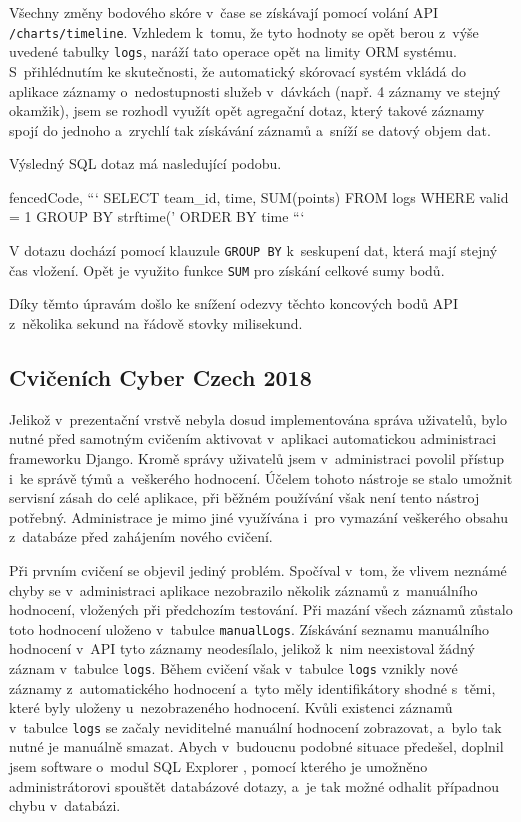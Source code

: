 \documentclass[
  digital,
  twoside,
  table, 
  nolof, 
  nolot
]{fithesis3}
\begin{document}
Všechny změny bodového skóre v~čase se získávají pomocí volání API \texttt{/charts/timeline}. Vzhledem k~tomu, že tyto hodnoty se opět berou z~výše uvedené tabulky \texttt{logs}, naráží tato operace opět na limity ORM systému. S~přihlédnutím ke skutečnosti, že automatický skórovací systém vkládá do aplikace záznamy o~nedostupnosti služeb v~dávkách (např. 4 záznamy ve stejný okamžik), jsem se rozhodl využít opět agregační dotaz, který takové záznamy spojí do jednoho a~zrychlí tak získávání záznamů a~sníží se datový objem dat.

Výsledný SQL dotaz má nasledující podobu.

\begin{markdown*}{%
  fencedCode,
}
```
SELECT team_id, time, SUM(points) FROM logs 
WHERE valid = 1 
GROUP BY strftime('%
ORDER BY time
```
\end{markdown*}

V dotazu dochází pomocí klauzule \texttt{GROUP\ BY} k~seskupení dat, která mají stejný čas vložení. Opět je využito funkce \texttt{SUM} pro získání celkové sumy bodů.

Díky těmto úpravám došlo ke snížení odezvy těchto koncových bodů API z~několika sekund na řádově stovky milisekund. 

\subsection{Cvičeních Cyber Czech 2018}

Jelikož v~prezentační vrstvě nebyla dosud implementována správa uživatelů, bylo nutné před samotným cvičením aktivovat v~aplikaci automatickou administraci frameworku Django. Kromě správy uživatelů jsem v~administraci povolil přístup i~ke správě týmů a~veškerého hodnocení. Účelem tohoto nástroje se stalo umožnit servisní zásah do celé aplikace, při běžném používání však není tento nástroj potřebný. Administrace je mimo jiné využívána i~pro vymazání veškerého obsahu z~databáze před zahájením nového cvičení.

Při prvním cvičení se objevil jediný problém. Spočíval v~tom, že vlivem neznámé chyby se v~administraci aplikace nezobrazilo několik záznamů z~manuálního hodnocení, vložených při předchozím testování. Při mazání všech záznamů zůstalo toto hodnocení uloženo v~tabulce \texttt{manualLogs}. Získávání seznamu manuálního hodnocení v~API tyto záznamy neodesílalo, jelikož k~nim neexistoval žádný záznam v~tabulce \texttt{logs}. Během cvičení však v~tabulce \texttt{logs} vznikly nové záznamy z~automatického hodnocení a~tyto měly identifikátory shodné s~těmi, které byly uloženy u~nezobrazeného hodnocení. Kvůli existenci záznamů v~tabulce \texttt{logs} se začaly neviditelné manuální hodnocení zobrazovat, a~bylo tak nutné je manuálně smazat. Abych v~budoucnu podobné situace předešel, doplnil jsem software o~modul SQL Explorer \cite{sqlexplorer}, pomocí kterého je umožněno administrátorovi spouštět databázové dotazy, a~je tak možné odhalit případnou chybu v~databázi.
\end{document}
